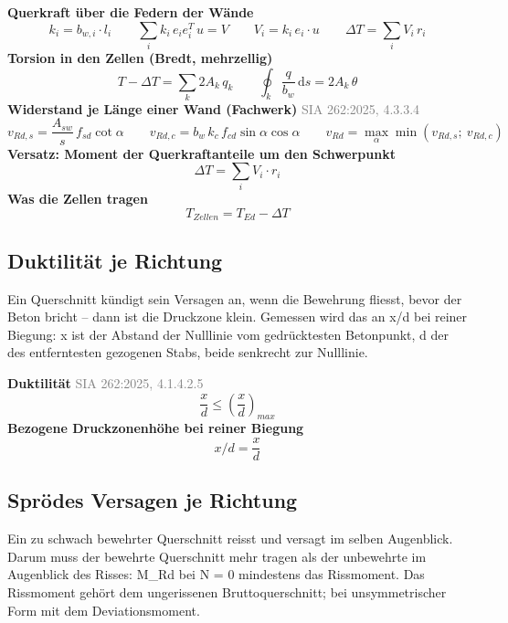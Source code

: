 \documentclass[11pt,a4paper]{article}
\newcommand{\normref}[1]{{\small\textcolor{gray}{#1}}}
\begin{document}
\noindent\textbf{Querkraft über die Federn der Wände}
\begin{equation*}
k_i = b_{w,i} \cdot l_i \qquad \sum_i k_i\, e_i e_i^T\, u = V \qquad V_i = k_i\, e_i \cdot u \qquad \Delta T = \sum_i V_i\, r_i
\end{equation*}
\noindent\textbf{Torsion in den Zellen (Bredt, mehrzellig)}
\begin{equation*}
T - \Delta T = \sum_k 2 A_k\, q_k \qquad \oint_k \frac{q}{b_w}\, \mathrm{d}s = 2 A_k\, \theta
\end{equation*}
\noindent\textbf{Widerstand je Länge einer Wand (Fachwerk)} \hfill \normref{SIA 262:2025, 4.3.3.4}
\begin{equation*}
v_{Rd,s} = \frac{A_{sw}}{s}\, f_{sd} \cot\alpha \qquad v_{Rd,c} = b_w\, k_c\, f_{cd} \sin\alpha \cos\alpha \qquad v_{Rd} = \max_\alpha \min(v_{Rd,s};\ v_{Rd,c})
\end{equation*}
\noindent\textbf{Versatz: Moment der Querkraftanteile um den Schwerpunkt}
\begin{equation*}
\Delta T = \sum_i V_i \cdot r_i
\end{equation*}
\noindent\textbf{Was die Zellen tragen}
\begin{equation*}
T_{Zellen} = T_{Ed} - \Delta T
\end{equation*}
\subsection{Duktilität je Richtung}
Ein Querschnitt kündigt sein Versagen an, wenn die Bewehrung fliesst, bevor der Beton bricht -- dann ist die Druckzone klein. Gemessen wird das an x/d bei reiner Biegung: x ist der Abstand der Nulllinie vom gedrücktesten Betonpunkt, d der des entferntesten gezogenen Stabs, beide senkrecht zur Nulllinie.

\noindent\textbf{Duktilität} \hfill \normref{SIA 262:2025, 4.1.4.2.5}
\begin{equation*}
\frac{x}{d} \le \left(\frac{x}{d}\right)_{max}
\end{equation*}
\noindent\textbf{Bezogene Druckzonenhöhe bei reiner Biegung}
\begin{equation*}
x/d = \frac{x}{d}
\end{equation*}
\subsection{Sprödes Versagen je Richtung}
Ein zu schwach bewehrter Querschnitt reisst und versagt im selben Augenblick. Darum muss der bewehrte Querschnitt mehr tragen als der unbewehrte im Augenblick des Risses: M\_Rd bei N = 0 mindestens das Rissmoment. Das Rissmoment gehört dem ungerissenen Bruttoquerschnitt; bei unsymmetrischer Form mit dem Deviationsmoment.
\end{document}
